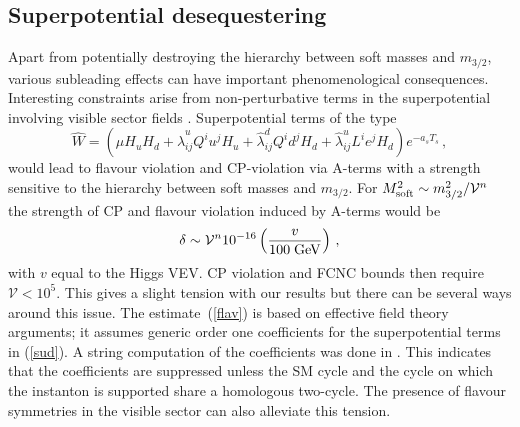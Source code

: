 \documentclass[11pt,a4paper]{article}
\newcommand{\be}{\begin{equation}}
\newcommand{\ee}{\end{equation}}
\newcommand\vo{{\mathcal{V}}}
\begin{document}
\subsection{Superpotential desequestering}

Apart from potentially destroying the hierarchy between soft masses and $m_{3/2}$,
various subleading effects can have important phenomenological consequences.
Interesting constraints arise from non-perturbative terms in the
superpotential involving visible sector fields \cite{Berg:2010ha}. Superpotential terms of the type
\be
\label{sud}
\hat{W} = \left( \hat{\mu} H_u H_d + \hat {\lambda}^u_{ij} Q^i u^j H_u
+ \hat {\lambda}^d_{ij}  Q^i d^j H_d + \hat {\lambda}^u_{ij} L^i e^j H_d \right) e^{-a_s T_s}\,,
\ee
would lead to flavour violation and CP-violation via A-terms with a strength sensitive to the hierarchy between soft masses and $m_{3/2}$.
For $M_{\rm soft}^2 \sim m_{3/2}^2/\vo^n$ the strength of CP and flavour violation induced by A-terms would be
\be
\label{flav}
\delta \sim  \vo^n   10^{-16} \left( {v \over 100 \phantom{.} {\rm GeV}} \right)\,,
\ee
with $v$ equal to the Higgs VEV. CP violation and FCNC bounds then require
$\vo < 10^5$. This gives a slight tension with our results but there can be several ways around this
issue. The estimate~(\ref{flav}) is based on effective field theory arguments; it assumes generic order one coefficients for the superpotential terms in (\ref{sud}).  A  string computation
of  the coefficients was done in \cite{Berg:2012aq}. This indicates that the coefficients are suppressed unless
the SM cycle and the cycle on which the instanton is supported share a homologous two-cycle. The presence of flavour symmetries \cite{1106.6039,1002.1790,1111.3047, 0810.5660} in the visible sector can also alleviate
this tension.



\end{document}
